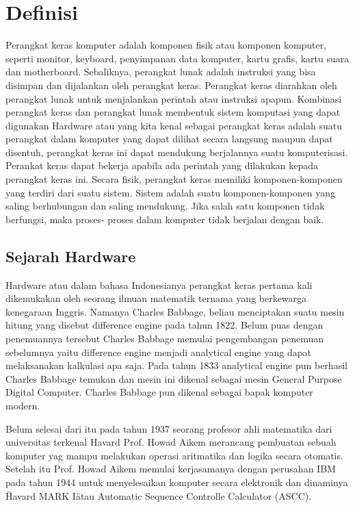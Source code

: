 
\section{Definisi}
Perangkat keras komputer adalah komponen fisik atau komponen komputer, seperti monitor, keyboard, penyimpanan data komputer, kartu grafis, kartu suara dan motherboard. Sebaliknya, perangkat lunak adalah instruksi yang bisa disimpan dan dijalankan oleh perangkat keras.
Perangkat keras diarahkan oleh perangkat lunak untuk menjalankan perintah atau instruksi apapun. Kombinasi perangkat keras dan perangkat lunak membentuk sistem komputasi yang dapat digunakan
Hardware atau yang kita kenal sebagai perangkat keras adalah suatu perangkat dalam komputer yang dapat dilihat secara langsung maupun dapat
disentuh, perangkat keras ini dapat mendukung berjalannya suatu komputerisasi. Perankat keras dapat bekerja apabila ada perintah yang
dilakukan kepada perangkat keras ini. Secara fisik, perangkat keras memiliki komponen-komponen yang terdiri dari suatu sistem. Sistem
adalah suatu komponen-komponen yang saling berhubungan dan saling mendukung. Jika salah satu komponen tidak berfungsi, maka proses-
proses dalam komputer tidak berjalan dengan baik.

\subsection{Sejarah Hardware}
Hardware atau dalam bahasa Indonesianya perangkat keras pertama kali dikemukakan oleh seorang ilmuan matematik ternama yang berkewarga
kenegaraan Inggris. Namanya Charles Babbage, beliau menciptakan suatu mesin hitung yang disebut difference engine pada tahun 1822.
Belum puas dengan penemuannya tersebut Charles Babbage memulai pengembangan penemuan sebelumnya yaitu difference engine menjadi
analytical engine yang dapat melaksanakan kalkulasi apa saja. Pada tahun 1833 analytical engine pun berhasil Charles Babbage temukan
dan mesin ini dikenal sebagai mesin General Purpose Digital Computer. Charles Babbage pun dikenal sebagai bapak komputer modern.

Belum selesai dari itu pada tahun 1937 seorang profesor ahli matematika dari universitas terkenal Havard Prof. Howad Aikem merancang
pembuatan sebuah komputer yag mampu melakukan operasi aritmatika dan logika secara otomatis. Setelah itu Prof. Howad Aikem memulai
kerjasamanya dengan perusahan IBM pada tahun 1944 untuk menyelesaikan komputer secara elektronik dan dinaminya \"Havard MARK I\" atau
Automatic Sequence Controlle Calculator (ASCC).

